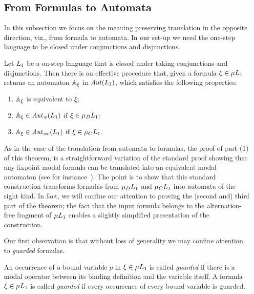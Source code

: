 \subsection{From Formulas to Automata}
   \label{sec:mc-to-parity}

In this subsection we focus on the meaning preserving translation in the
opposite direction, viz., from formula to automata.
In our set-up we need the one-step language to be closed under conjunctions and
disjunctions.

\begin{theorem}\label{t:fortoaut}
Let $L_{1}$ be a on-step language that is closed under taking conjunctions and 
disjunctions.
Then there is an effective procedure that, given a formula $\xi \in \mu L_{1}$
returns an automaton $\mathbb{A}_{\xi}$ in $\mathit{Aut}(L_{1})$, which satisfies the 
following properties:
\begin{enumerate}[(1)]
\item $\mathbb{A}_\xi$ is equivalent to $\xi$;
\item  $\mathbb{A}_\xi \in \mathit{Aut}_{w}(L_{1})$ if $\xi \in \mu_{D}L_{1}$;
\item  $\mathbb{A}_\xi \in \mathit{Aut}_{wc}(L_{1})$ if $\xi \in \mu_{C}L_{1}$.
\end{enumerate}
\end{theorem}

As in the case of the translation from automata to formulas, the proof of part
(1) of this theorem, is a straightforward variation of the standard proof showing
that any fixpoint modal formula can be translated into an equivalent modal 
automaton (see for instance~\cite[Section 6]{Ven08}). 
The point is to show that this standard construction transforms formulas from 
$\mu_{D}L_{1}$ and $\mu_{C}L_{1}$ into automata of the right kind.
In fact, we will confine our attention to proving the (second and) third part
of the theorem; the fact that the input formula belongs to the alternation-free
fragment of $\mu L_{1}$ enables a slightly simplified presentation of the 
construction.

Our first observation is that without loss of generality we may confine 
attention to \emph{guarded} formulas.

\begin{definition}
An occurrence of a bound variable $p$ in $\xi  \in \mu L_{1}$ is called 
\emph{guarded} if there is a modal operator between its binding definition and 
the variable itself. 
A formula $\xi  \in \mu L_{1}$ is called \emph{guarded} if every occurrence of
every bound variable is guarded.
\end{definition}

